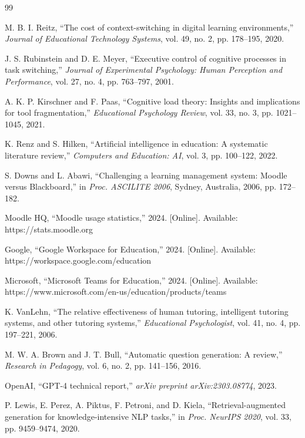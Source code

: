 \documentclass[12pt,a4paper]{report}
\begin{document}
\begin{thebibliography}{99}

M. B. I. Reitz, ``The cost of context-switching in digital learning environments,'' \textit{Journal of Educational Technology Systems}, vol. 49, no. 2, pp. 178--195, 2020.

J. S. Rubinstein and D. E. Meyer, ``Executive control of cognitive processes in task switching,'' \textit{Journal of Experimental Psychology: Human Perception and Performance}, vol. 27, no. 4, pp. 763--797, 2001.

A. K. P. Kirschner and F. Paas, ``Cognitive load theory: Insights and implications for tool fragmentation,'' \textit{Educational Psychology Review}, vol. 33, no. 3, pp. 1021--1045, 2021.

K. Renz and S. Hilken, ``Artificial intelligence in education: A systematic literature review,'' \textit{Computers and Education: AI}, vol. 3, pp. 100--122, 2022.

S. Downs and L. Abawi, ``Challenging a learning management system: Moodle versus Blackboard,'' in \textit{Proc. ASCILITE 2006}, Sydney, Australia, 2006, pp. 172--182.

Moodle HQ, ``Moodle usage statistics,'' 2024. [Online]. Available: https://stats.moodle.org

Google, ``Google Workspace for Education,'' 2024. [Online]. Available: https://workspace.google.com/education

Microsoft, ``Microsoft Teams for Education,'' 2024. [Online]. Available: https://www.microsoft.com/en-us/education/products/teams

K. VanLehn, ``The relative effectiveness of human tutoring, intelligent tutoring systems, and other tutoring systems,'' \textit{Educational Psychologist}, vol. 41, no. 4, pp. 197--221, 2006.

M. W. A. Brown and J. T. Bull, ``Automatic question generation: A review,'' \textit{Research in Pedagogy}, vol. 6, no. 2, pp. 141--156, 2016.

OpenAI, ``GPT-4 technical report,'' \textit{arXiv preprint arXiv:2303.08774}, 2023.

P. Lewis, E. Perez, A. Piktus, F. Petroni, and D. Kiela, ``Retrieval-augmented generation for knowledge-intensive NLP tasks,'' in \textit{Proc. NeurIPS 2020}, vol. 33, pp. 9459--9474, 2020.


\end{thebibliography}
\end{document}
